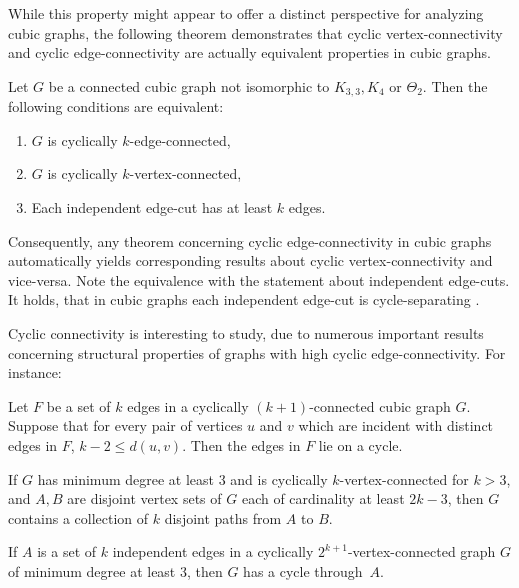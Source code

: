 \documentclass[12pt, twoside]{book}
\begin{document}
While this property might appear to offer a distinct perspective for analyzing cubic graphs, the following theorem demonstrates that cyclic \mbox{vertex-connectivity} and cyclic \mbox{edge-connectivity} are actually equivalent properties in cubic graphs.

\begin{theorem}\label{th:cyclic-vertex-edge-independent-equivalence}
	Let $G$ be a connected cubic graph not isomorphic to $K_{3,3},K_4$ or $\Theta_2$. Then the following conditions are equivalent:
	\begin{enumerate}[label=(\roman*)]
		\item $G$ is cyclically $k$-edge-connected,
		\item $G$ is cyclically $k$-vertex-connected,
		\item Each independent edge-cut has at least $k$ edges.
	\end{enumerate}
\end{theorem}

Consequently, any theorem concerning cyclic edge-connectivity in cubic graphs automatically yields corresponding results about cyclic vertex-connectivity and vice-versa. Note the equivalence with the statement about independent edge-cuts. It holds, that in cubic graphs each independent edge-cut is cycle-separating \cite{atoms-of-cyclic}.

Cyclic connectivity is interesting to study, due to numerous important results concerning structural properties of graphs with high cyclic edge-connectivity. For instance:

\begin{theorem}
	Let $F$ be a set of $k$ edges in a cyclically $(k + 1)$-connected cubic graph $G$. Suppose that for every pair of vertices $u$ and $v$ which are incident with distinct edges in $F$, $k - 2\leq d(u,v)$. Then the edges in $F$ lie on a cycle.
\end{theorem}

\begin{proposition}
	If $G$ has minimum degree at least 3 and is cyclically $k$-vertex-connected for $k > 3$, and $A, B$ are disjoint vertex sets of $G$ each of cardinality at least $2k - 3$, then $G$ contains a collection of $k$ disjoint paths from $A$ to $B$.
\end{proposition}

\begin{theorem}
	If $A$ is a set of $k$ independent edges in a cyclically \mbox{$2^{k+1}$-vertex-connected} graph $G$ of minimum degree at least 3, then $G$ has a cycle \mbox{through $A$}.
\end{theorem}
\end{document}
